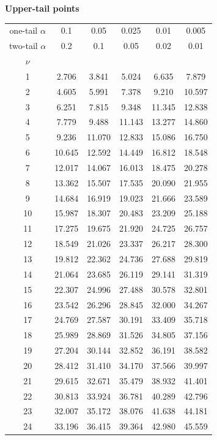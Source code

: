 \textbf{Upper-tail points}

\begin{center}
\small
\begin{tabular}{c|ccccc}
\toprule
one-tail $\alpha$ & 0.1 & 0.05 & 0.025 & 0.01 & 0.005 \\
two-tail $\alpha$ & 0.2 & 0.1 & 0.05 & 0.02 & 0.01 \\
$\nu$ &  &  &  &  &  \\
\midrule
1 & 2.706 & 3.841 & 5.024 & 6.635 & 7.879 \\
2 & 4.605 & 5.991 & 7.378 & 9.210 & 10.597 \\
3 & 6.251 & 7.815 & 9.348 & 11.345 & 12.838 \\
4 & 7.779 & 9.488 & 11.143 & 13.277 & 14.860 \\
5 & 9.236 & 11.070 & 12.833 & 15.086 & 16.750 \\
6 & 10.645 & 12.592 & 14.449 & 16.812 & 18.548 \\
7 & 12.017 & 14.067 & 16.013 & 18.475 & 20.278 \\
8 & 13.362 & 15.507 & 17.535 & 20.090 & 21.955 \\
9 & 14.684 & 16.919 & 19.023 & 21.666 & 23.589 \\
10 & 15.987 & 18.307 & 20.483 & 23.209 & 25.188 \\
11 & 17.275 & 19.675 & 21.920 & 24.725 & 26.757 \\
12 & 18.549 & 21.026 & 23.337 & 26.217 & 28.300 \\
13 & 19.812 & 22.362 & 24.736 & 27.688 & 29.819 \\
14 & 21.064 & 23.685 & 26.119 & 29.141 & 31.319 \\
15 & 22.307 & 24.996 & 27.488 & 30.578 & 32.801 \\
16 & 23.542 & 26.296 & 28.845 & 32.000 & 34.267 \\
17 & 24.769 & 27.587 & 30.191 & 33.409 & 35.718 \\
18 & 25.989 & 28.869 & 31.526 & 34.805 & 37.156 \\
19 & 27.204 & 30.144 & 32.852 & 36.191 & 38.582 \\
20 & 28.412 & 31.410 & 34.170 & 37.566 & 39.997 \\
21 & 29.615 & 32.671 & 35.479 & 38.932 & 41.401 \\
22 & 30.813 & 33.924 & 36.781 & 40.289 & 42.796 \\
23 & 32.007 & 35.172 & 38.076 & 41.638 & 44.181 \\
24 & 33.196 & 36.415 & 39.364 & 42.980 & 45.559 \\

\end{tabular}
\end{center}
